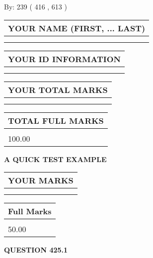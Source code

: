\documentclass[12pt]{article}
\begin{document}
   
\hspace{1.0in} By: 
 239 ( 416 ,  613 )
   
   
   
   
\newpage 
\setcounter{page}{ 
   425001 } 
   
   
   
   
\noindent\begin{tabular}{|l|}
\hline
YOUR NAME (FIRST, ... LAST)  \\
\hline
 \\ 
 \\ 
\hline
\end{tabular}
\hspace{0.05in} \begin{tabular}{|l|}
\hline
 YOUR   ID   INFORMATION  \\
\hline
 \\ 
 \\ 
\hline
\end{tabular}
   
   
\vspace{0.2in}\noindent\begin{tabular}{|l|}
\hline
YOUR TOTAL MARKS  \\
\hline
 \\ 
 \\ 
\hline
\end{tabular}
\hspace{0.05in} \begin{tabular}{|l|}
\hline
TOTAL FULL MARKS  \\
\hline
 \\ 
100.00 \\
\hline
\end{tabular}
   
   
 \vspace{0.2in}
{\LARGE {\textbf{ A QUICK TEST EXAMPLE}}}
   
   
  
\vspace{0.2in}
  
\noindent\begin{tabular}{|l|}
\hline
 YOUR MARKS  \\
\hline
 \\ 
 \\ 
\hline
\end{tabular}
\hspace{0.05in} \begin{tabular}{|l|}
\hline
 Full Marks  \\
\hline
 \\ 
50.00 \\
\hline
\end{tabular}
{\textbf{\Large{QUESTION
425.1 
}}}
  
\end{document}
